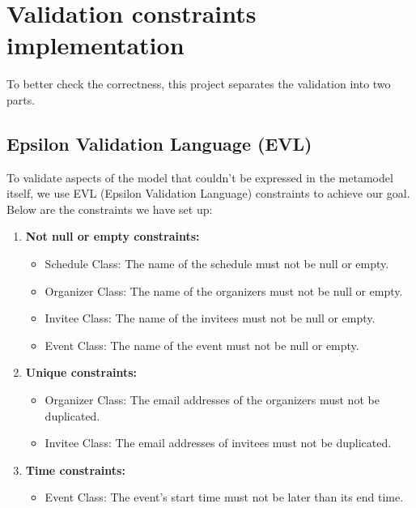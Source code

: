 \documentclass[12pt, letterpaper, twoside]{article}
\begin{document}
\newpage
\section{Validation constraints implementation}
To better check the correctness, this project separates the validation into two parts.

\subsection{Epsilon Validation Language (EVL)}
To validate aspects of the model that couldn't be expressed in the metamodel itself, we use EVL (Epsilon Validation Language) constraints to achieve our goal. Below are the constraints we have set up:
\begin{enumerate}
    \item \textbf{Not null or empty constraints:}
    \begin{itemize}
        \item Schedule Class: The name of the schedule must not be null or empty.
        \item Organizer Class: The name of the organizers must not be null or empty.
        \item Invitee Class: The name of the invitees must not be null or empty.
        \item Event Class: The name of the event must not be null or empty.
    \end{itemize}
    \item \textbf{Unique constraints:}
    \begin{itemize}
        \item Organizer Class: The email addresses of the organizers must not be duplicated.
        \item Invitee Class: The email addresses of invitees must not be duplicated.
    \end{itemize}
    \item \textbf{Time constraints:}
    \begin{itemize}
        \item Event Class: The event's start time must not be later than its end time.
    \end{itemize}
\end{enumerate}
\end{document}
